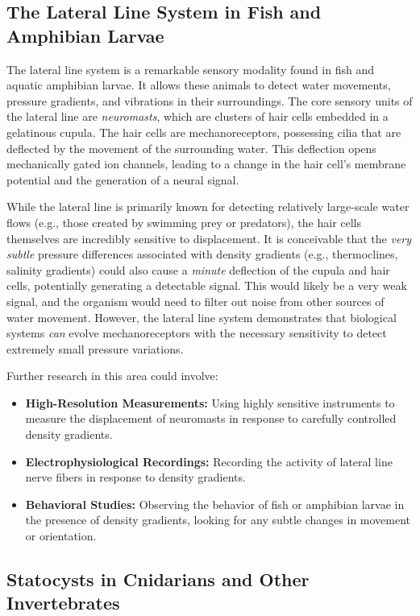 \documentclass[11pt]{article}
\begin{document}
\subsection{The Lateral Line System in Fish and Amphibian Larvae}

The lateral line system is a remarkable sensory modality found in fish and aquatic amphibian larvae. It allows these animals to detect water movements, pressure gradients, and vibrations in their surroundings. The core sensory units of the lateral line are \textit{neuromasts}, which are clusters of hair cells embedded in a gelatinous cupula. The hair cells are mechanoreceptors, possessing cilia that are deflected by the movement of the surrounding water. This deflection opens mechanically gated ion channels, leading to a change in the hair cell's membrane potential and the generation of a neural signal.

While the lateral line is primarily known for detecting relatively large-scale water flows (e.g., those created by swimming prey or predators), the hair cells themselves are incredibly sensitive to displacement. It is conceivable that the \textit{very subtle} pressure differences associated with density gradients (e.g., thermoclines, salinity gradients) could also cause a \textit{minute} deflection of the cupula and hair cells, potentially generating a detectable signal. This would likely be a very weak signal, and the organism would need to filter out noise from other sources of water movement. However, the lateral line system demonstrates that biological systems \textit{can} evolve mechanoreceptors with the necessary sensitivity to detect extremely small pressure variations.

Further research in this area could involve:
\begin{itemize}
    \item \textbf{High-Resolution Measurements:} Using highly sensitive instruments to measure the displacement of neuromasts in response to carefully controlled density gradients.
    \item \textbf{Electrophysiological Recordings:} Recording the activity of lateral line nerve fibers in response to density gradients.
    \item \textbf{Behavioral Studies:} Observing the behavior of fish or amphibian larvae in the presence of density gradients, looking for any subtle changes in movement or orientation.
\end{itemize}

\subsection{Statocysts in Cnidarians and Other Invertebrates}
\end{document}
